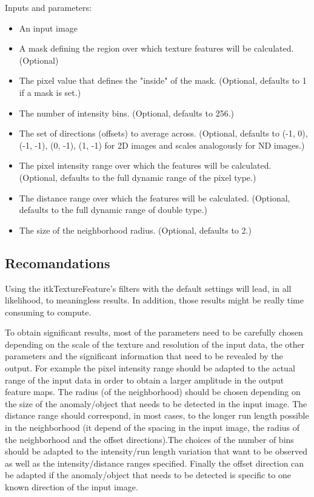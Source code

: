 \documentclass{InsightArticle}
\begin{document}
Inputs and parameters:
\begin{itemize}
 \item An input image
 \item A mask defining the region over which texture features will be calculated. (Optional)
 \item The pixel value that defines the "inside" of the mask. (Optional, defaults to 1 if a mask is set.)
 \item The number of intensity bins. (Optional, defaults to 256.)
 \item The set of directions (offsets) to average across. (Optional, defaults to {(-1, 0), (-1, -1), (0, -1), (1, -1)} for 2D images and scales analogously for ND images.)
 \item The pixel intensity range over which the features will be calculated. (Optional, defaults to the full dynamic range of the pixel type.)
 \item The distance range over which the features will be calculated. (Optional, defaults to the full dynamic range of double type.)
 \item The size of the neighborhood radius. (Optional, defaults to 2.)
\end{itemize}

\subsection{Recomandations}
\label{sec:recomandations}

Using the itkTextureFeature's filters with the default settings will lead, in all likelihood, to meaningless results. In addition, those results might be really time consuming to compute.

To obtain significant results, most of the parameters need to be carefully chosen depending on the scale of the texture and resolution of the input data, the other parameters and the significant information that need to be revealed by the output. For example the pixel intensity range should be adapted to the actual range of the input data in order to obtain a larger amplitude in the output feature maps. The radius (of the neighborhood) should be chosen depending on the size of the anomaly/object that needs to be detected in the input image. The distance range should correspond, in most cases, to the longer run length possible in the neighborhood (it depend of the spacing in the input image, the radius of the neighborhood and the offset directions).The choices of the number of bins should be adapted to the intensity/run length variation that want to be observed as well as the intensity/distance ranges specified. Finally the offset direction can be adapted if the anomaly/object that needs to be detected is specific to one known direction of the input image.
\end{document}
